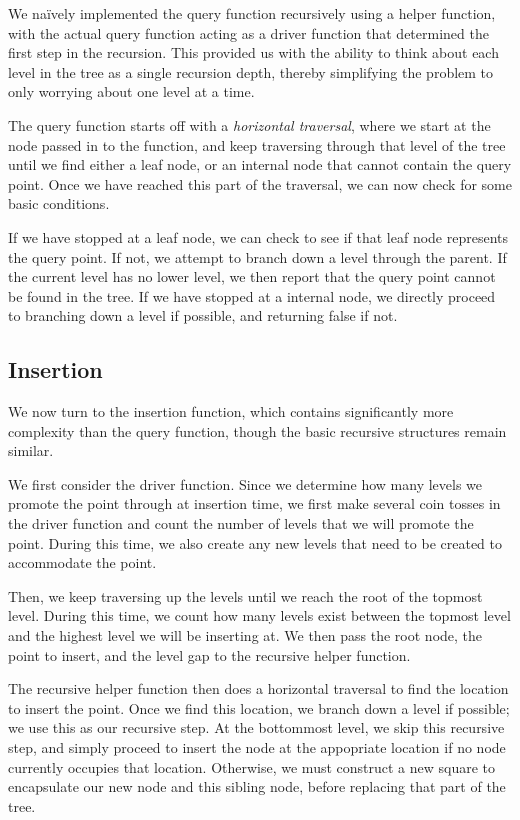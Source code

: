 \documentclass[10pt]{article}
\begin{document}
We na\"ively implemented the query function recursively using a helper function, with the actual query function acting as a driver function that determined the first step in the recursion. This provided us with the ability to think about each level in the tree as a single recursion depth, thereby simplifying the problem to only worrying about one level at a time.

The query function starts off with a \textit{horizontal traversal}, where we start at the node passed in to the function, and keep traversing through that level of the tree until we find either a leaf node, or an internal node that cannot contain the query point. Once we have reached this part of the traversal, we can now check for some basic conditions.

If we have stopped at a leaf node, we can check to see if that leaf node represents the query point. If not, we attempt to branch down a level through the parent. If the current level has no lower level, we then report that the query point cannot be found in the tree. If we have stopped at a internal node, we directly proceed to branching down a level if possible, and returning false if not.

\subsection{Insertion}
We now turn to the insertion function, which contains significantly more complexity than the query function, though the basic recursive structures remain similar.

We first consider the driver function. Since we determine how many levels we promote the point through at insertion time, we first make several coin tosses in the driver function and count the number of levels that we will promote the point. During this time, we also create any new levels that need to be created to accommodate the point.

Then, we keep traversing up the levels until we reach the root of the topmost level. During this time, we count how many levels exist between the topmost level and the highest level we will be inserting at. We then pass the root node, the point to insert, and the level gap to the recursive helper function.

The recursive helper function then does a horizontal traversal to find the location to insert the point. Once we find this location, we branch down a level if possible; we use this as our recursive step. At the bottommost level, we skip this recursive step, and simply proceed to insert the node at the appopriate location if no node currently occupies that location. Otherwise, we must construct a new square to encapsulate our new node and this sibling node, before replacing that part of the tree.
\end{document}
